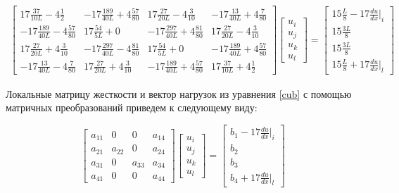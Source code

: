 \begin{align}\label{cub}
\begin{bmatrix}17\frac{37}{10L} -4  \frac{1}{2} &   -17 \frac{189}{40L} +4  \frac{57}{80} & 17\frac{27}{20L} -4  \frac{3}{10} &   -17 \frac{13}{40L}  +4   \frac{7}{80}\\
	  -17 \frac{189}{40L}  -4  \frac{57}{80} & 17\frac{54}{5L}+0 &   -17 \frac{297}{40L} +4  \frac{81}{80} & 17\frac{27}{20L}  -4  \frac{3}{10} \\
	17\frac{27}{20L}  +4   \frac{3}{10} &   -17 \frac{297}{40L} -4  \frac{81}{80} & 17\frac{54}{5L}+0 &   -17 \frac{189}{40L}  +4  \frac{57}{80} \\
	  -17 \frac{13}{40L}  -4  \frac{7}{80} & 17\frac{27}{20L} +4  \frac{3}{10} &   -17 \frac{189}{40L} +4  \frac{57}{80} & 17\frac{37}{10L}  +4  \frac{1}{2}
\end{bmatrix}
\begin{bmatrix}
	u_i \\
	u_j \\
	u_k\\
	u_l
\end{bmatrix}
=
\begin{bmatrix}
    15\frac{L}{8}   -17  \frac{du}{dx}|_i \\
	15\frac{3L}{8}\\
	15\frac{3L}{8}\\
	15\frac{L}{8}   +17  \frac{du}{dx}|_l
\end{bmatrix}
\end{align}

Локальные матрицу жесткости и вектор нагрузок из уравнения \ref{cub} с помощью матричных преобразований приведем к следующему виду:

$$ \begin{bmatrix}
a_{11}     &  0  & 0  &  a_{14}\\
a_{21}     &  a_{22}  & 0  &  a_{24}\\
a_{31}     &  0  &  a_{33} &  a_{34}\\
a_{41}     &  0  & 0  &  a_{44}
\end{bmatrix}
\begin{bmatrix}
u_i \\
u_j \\
u_k\\
u_l
\end{bmatrix} =
\begin{bmatrix}
b_1   -17  \frac{du}{dx}|_i \\
b_2\\
b_3\\
b_4   +17  \frac{du}{dx}|_l
\end{bmatrix}$$

